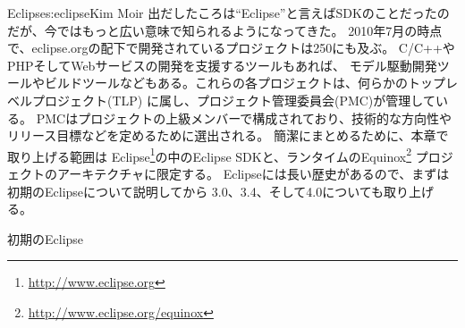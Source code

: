 \begin{aosachapter}{Eclipse}{s:eclipse}{Kim Moir}
出だしたころは``Eclipse''と言えばSDKのことだったのだが、今ではもっと広い意味で知られるようになってきた。
2010年7月の時点で、eclipse.orgの配下で開発されているプロジェクトは250にも及ぶ。
C/C++やPHPそしてWebサービスの開発を支援するツールもあれば、
モデル駆動開発ツールやビルドツールなどもある。これらの各プロジェクトは、何らかのトップレベルプロジェクト(TLP)
に属し、プロジェクト管理委員会(PMC)が管理している。
PMCはプロジェクトの上級メンバーで構成されており、技術的な方向性やリリース目標などを定めるために選出される。
簡潔にまとめるために、本章で取り上げる範囲は
Eclipse\footnote{\url{http://www.eclipse.org}}の中のEclipse SDKと、ランタイムのEquinox\footnote{\url{http://www.eclipse.org/equinox}}
プロジェクトのアーキテクチャに限定する。
Eclipseには長い歴史があるので、まずは初期のEclipseについて説明してから
3.0、3.4、そして4.0についても取り上げる。

\begin{aosasect1}{初期のEclipse}


\end{aosasect1}
\end{aosachapter}
